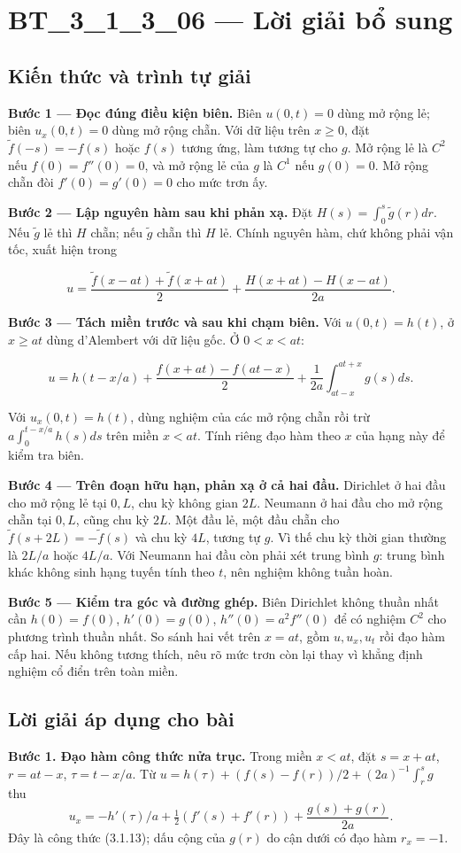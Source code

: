 \documentclass[10pt,a4paper]{article}
\begin{document}
\section*{BT\_3\_1\_3\_06 — Lời giải bổ sung}
\subsection*{Kiến thức và trình tự giải}
\textbf{Bước 1 — Đọc đúng điều kiện biên.} Biên $u(0,t)=0$ dùng mở rộng lẻ; biên $u_x(0,t)=0$ dùng mở rộng chẵn. Với dữ liệu trên $x\ge0$, đặt $\widetilde f(-s)=-f(s)$ hoặc $f(s)$ tương ứng, làm tương tự cho $g$. Mở rộng lẻ là $C^2$ nếu $f(0)=f''(0)=0$, và mở rộng lẻ của $g$ là $C^1$ nếu $g(0)=0$. Mở rộng chẵn đòi $f'(0)=g'(0)=0$ cho mức trơn ấy.

\textbf{Bước 2 — Lập nguyên hàm sau khi phản xạ.} Đặt $H(s)=\int_0^s\widetilde g(r)dr$. Nếu $\widetilde g$ lẻ thì $H$ chẵn; nếu $\widetilde g$ chẵn thì $H$ lẻ. Chính nguyên hàm, chứ không phải vận tốc, xuất hiện trong


\[
u=\frac{\widetilde f(x-at)+\widetilde f(x+at)}2+\frac{H(x+at)-H(x-at)}{2a}.
\]


\textbf{Bước 3 — Tách miền trước và sau khi chạm biên.} Với $u(0,t)=h(t)$, ở $x\ge at$ dùng d'Alembert với dữ liệu gốc. Ở $0<x<at$:


\[
u=h(t-x/a)+\frac{f(x+at)-f(at-x)}2+\frac1{2a}\int_{at-x}^{at+x}g(s)ds.
\]


Với $u_x(0,t)=h(t)$, dùng nghiệm của các mở rộng chẵn rồi trừ $a\int_0^{t-x/a}h(s)ds$ trên miền $x<at$. Tính riêng đạo hàm theo $x$ của hạng này để kiểm tra biên.

\textbf{Bước 4 — Trên đoạn hữu hạn, phản xạ ở cả hai đầu.} Dirichlet ở hai đầu cho mở rộng lẻ tại $0,L$, chu kỳ không gian $2L$. Neumann ở hai đầu cho mở rộng chẵn tại $0,L$, cũng chu kỳ $2L$. Một đầu lẻ, một đầu chẵn cho $\widetilde f(s+2L)=-\widetilde f(s)$ và chu kỳ $4L$, tương tự $g$. Vì thế chu kỳ thời gian thường là $2L/a$ hoặc $4L/a$. Với Neumann hai đầu còn phải xét trung bình $g$: trung bình khác không sinh hạng tuyến tính theo $t$, nên nghiệm không tuần hoàn.

\textbf{Bước 5 — Kiểm tra góc và đường ghép.} Biên Dirichlet không thuần nhất cần $h(0)=f(0)$, $h'(0)=g(0)$, $h''(0)=a^2f''(0)$ để có nghiệm $C^2$ cho phương trình thuần nhất. So sánh hai vết trên $x=at$, gồm $u,u_x,u_t$ rồi đạo hàm cấp hai. Nếu không tương thích, nêu rõ mức trơn còn lại thay vì khẳng định nghiệm cổ điển trên toàn miền.
\subsection*{Lời giải áp dụng cho bài}
\textbf{Bước 1. Đạo hàm công thức nửa trục.} Trong miền $x<at$, đặt $s=x+at$, $r=at-x$, $\tau=t-x/a$. Từ $u=h(\tau)+(f(s)-f(r))/2+(2a)^{-1}\int_r^s g$ thu
\[u_x=-h'(\tau)/a+\tfrac12(f'(s)+f'(r))+\frac{g(s)+g(r)}{2a}.\]
Đây là công thức (3.1.13); dấu cộng của $g(r)$ do cận dưới có đạo hàm $r_x=-1$.
\end{document}
